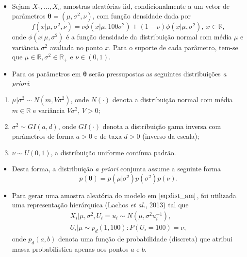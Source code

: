 \documentclass[9pt]{beamer}
\begin{document}
\begin{frame}
\begin{itemize}
\justifying	
\item Sejam $X_{1}, \ldots, X_{n}$ amostras aleatórias iid, condicionalmente a um vetor de parâmetros $\boldsymbol{\theta} = (\mu, \sigma^2, \nu)$, com função densidade dada por
\begin{equation}\label{eq:dist_am}
f(x | \mu, \sigma^2, \nu) = \nu \phi(x | \mu, 100 \sigma^2) + (1 - \nu) \phi(x | \mu, \sigma^2), \ x \in \mathbb{R},
\end{equation}
\noindent onde $\phi(x | \mu, \sigma^2)$ é a função densidade da distribuição normal com média $\mu$ e variância $\sigma^2$ avaliada no ponto $x$. Para o suporte de cada parâmetro, tem-se que $\mu \in \mathbb{R}, \sigma^2 \in \mathbb{R}_+$ e $\nu \in (0,1)$.
\item Para os parâmetros em $\boldsymbol{\theta}$ serão pressupostas as seguintes distribuições \textit{a priori}:
\end{itemize}
\begin{enumerate}
\justifying
\item $\mu | \sigma^2 \sim{N} (m, V \sigma^2)$, onde $N(\cdot)$ denota a distribuição normal com média $m \in \mathbb{R}$ e variância $V \sigma^2$, $V > 0$;
\item $\sigma^2 \sim{GI} (a,d)$, onde $GI(\cdot)$ denota a distribuição gama inversa com parâmetros de forma $a > 0$ e de taxa $d > 0$ (inverso da escala);
\item $\nu \sim{U}(0,1)$, a distribuição uniforme contínua padrão.
\end{enumerate}
\end{frame}
\begin{frame}
\begin{itemize}
\justifying	
\item Desta forma, a distribuição \textit{a priori} conjunta assume a seguinte forma
\begin{equation}
p(\boldsymbol{\theta}) = p(\mu|\sigma^2) p(\sigma^2)p(\nu).
\end{equation}
\item Para gerar uma amostra aleatória do modelo em $\eqref{eq:dist_am}$, foi utilizada uma representação hierárquica (Lachos \textit{et al.}, 2013) tal que
\begin{gather}
X_i | \mu, \sigma^2, U_{i} = u_i \sim{N}(\mu, \sigma^2 u_i^{-1}), \nonumber \\
U_i | \mu \sim{p_d}(1,100) : P(U_i = 100) = \nu, \label{eq:hier}
\end{gather}
\noindent onde $p_d(a,b)$ denota uma função de probabilidade (discreta) que atribui massa probabilística apenas aos pontos $a$ e $b$.
\end{itemize}
\end{frame}
\end{document}
